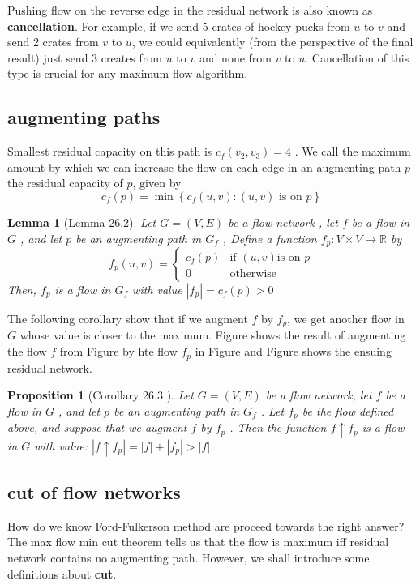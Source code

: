 \documentclass[a4paper, 10pt]{ctexart} %
\newtheorem{lemma}{Lemma}
\newtheorem{proposition}{Proposition}
\begin{document}
Pushing flow on the reverse edge in the residual
network is also known as \textbf{cancellation}. For example, if we send 5 crates of hockey
pucks from $ u $ to $ v $ and send 2 crates from $ v $  to $ u $, we could equivalently (from the
perspective of the final result) just send 3 creates from $ u $ to $ v $ and none from $ v $ to $ u $.
Cancellation of this type is crucial for any maximum-flow algorithm.


\subsection{augmenting paths}
Smallest residual capacity on this path is 
$ c_{f} \left(v_2 , v_3   \right) = 4 $ . We call the maximum amount 
by which we can increase the flow on each edge in 
an augmenting path $ p $ the residual capacity of $p$, given by 
$$ c_{f} \left( p\right) = \min \left\{ c _{f} \left( u  , v\right) : \left( u ,v\right) \text{ is on }p\right\} $$

\begin{lemma}[Lemma 26.2]
Let $ G = \left(V, E \right) $ be a flow network , let $ f $ be a flow in $ G $ , and let $ p $ be an augmenting path in $ G_{f} $ , Define a function $ f_{p} : V \times V  \to \mathbb{R} $ by 
$$ f _{p}  \left( u , v\right) = \begin{cases} c_{f } \left(p\right) & \text{if } \left( u,  v\right) \text{is on } p\\ 0 & \text {otherwise} \end{cases} $$
Then, $ f _{p} $ is a flow in $ G_{f} $ with value $ \left|  f_{p} \right|  = c_{f} \left(p\right) > 0 $
\end{lemma}

The following corollary show that 
if we augment $ f $ by $ f_{p} $, 
we get another flow in $ G $ whose 
value is closer to the maximum. 
Figure shows the result of augmenting 
the flow $ f $ from Figure by 
hte flow $ f_{p} $ in Figure
and Figure shows the 
ensuing residual network. 
\begin{proposition}[Corollary 26.3 ]
Let $ G = \left(V, E\right) $ be a flow network, 
let $ f $ be a flow in $ G $ , and
let $ p $ be an augmenting path in 
$ G_{f} $ . Let $ f_{p} $ be the flow defined 
above, and suppose that we augment $ f $ by 
$ f_{p} $ . Then the function 
$ f \uparrow f_{p} $ is a flow in $ G $ with value: $ \left| f \uparrow f_{p} \right| =  \left| f \right|  + \left| f_{p} \right|  > \left| f \right| $
\end{proposition}
\subsection{cut of flow networks}
How do we know Ford-Fulkerson method are 
proceed towards the 
right answer? 
The max flow min cut theorem 
tells us that 
the flow is maximum iff 
residual network contains no 
augmenting path. 
However, we shall introduce some definitions
about \textbf{cut}.
\end{document}

